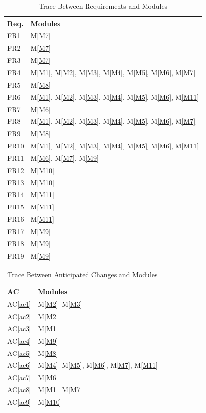 \documentclass[12pt, titlepage]{article}
\newcommand{\acref}[1]{AC\ref{#1}}
\newcommand{\mref}[1]{M\ref{#1}}
\begin{document}
\begin{table}[H]
\centering
\begin{tabular}{p{} p{}}
\toprule
\textbf{Req.} & \textbf{Modules}\\
\midrule
FR1 & \mref{M7}\\
FR2 & \mref{M7}\\
FR3 & \mref{M7}\\
FR4 & \mref{M1}, \mref{M2}, \mref{M3}, \mref{M4}, \mref{M5}, \mref{M6}, \mref{M7}\\
FR5 & \mref{M8}\\
FR6 & \mref{M1}, \mref{M2}, \mref{M3}, \mref{M4}, \mref{M5}, \mref{M6}, \mref{M11}\\
FR7 & \mref{M6}\\
FR8 & \mref{M1}, \mref{M2}, \mref{M3}, \mref{M4}, \mref{M5}, \mref{M6}, \mref{M7}\\
FR9 & \mref{M8}\\
FR10 & \mref{M1}, \mref{M2}, \mref{M3}, \mref{M4}, \mref{M5}, \mref{M6}, \mref{M11}\\
FR11 & \mref{M6}, \mref{M7}, \mref{M9}\\
FR12 & \mref{M10}\\
FR13 & \mref{M10}\\
FR14 & \mref{M11}\\
FR15 & \mref{M11}\\
FR16 & \mref{M11}\\
FR17 & \mref{M9}\\
FR18 & \mref{M9}\\
FR19 & \mref{M9}\\
\bottomrule
\end{tabular}
\caption{Trace Between Requirements and Modules}
\label{TblRT}
\end{table}

\begin{table}[H]
\centering
\begin{tabular}{p{} p{}}
\toprule
\textbf{AC} & \textbf{Modules}\\
\midrule
\acref{ac1} & \mref{M2}, \mref{M3}\\
\acref{ac2} & \mref{M2}\\
\acref{ac3} & \mref{M1}\\
\acref{ac4} & \mref{M9}\\
\acref{ac5} & \mref{M8}\\
\acref{ac6} & \mref{M4}, \mref{M5}, \mref{M6}, \mref{M7}, \mref{M11}\\
\acref{ac7} & \mref{M6}\\
\acref{ac8} & \mref{M1}, \mref{M7}\\
\acref{ac9} & \mref{M10}\\
\bottomrule
\end{tabular}
\caption{Trace Between Anticipated Changes and Modules}
\label{TblACT}
\end{table}
\end{document}
